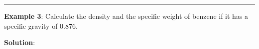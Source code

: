 \documentclass[10pt]{amsart}
\begin{document}
\par\vspace{2cm}

\rule{\textwidth}{0.02in}
\par
\begin{minipage}[t]{0.45\textwidth}
 \raggedright
 \textbf{Example 3}:\parb
 Calculate the density and the specific weight of benzene if it has a specific gravity of 0.876.
 \par\vspace{6cm}
\end{minipage}
\hfill
\begin{minipage}[t]{0.5\textwidth}
 \textbf{Solution}:
 \parb
\end{minipage}

\newpage
\end{document}
